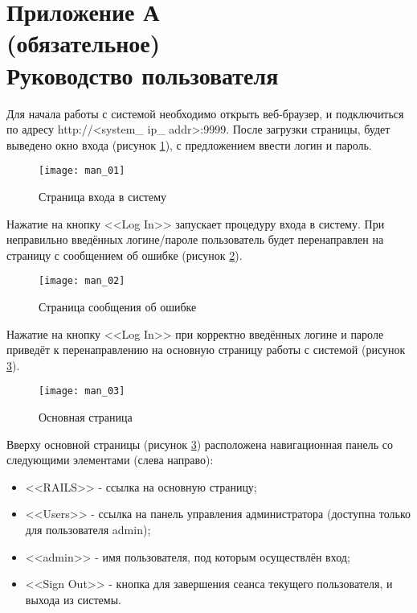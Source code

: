 \section*{Приложение А\\(обязательное)\\Руководство пользователя}

Для начала работы с системой необходимо открыть веб-браузер, и подключиться по адресу http://<system\_ ip\_ addr>:9999.
После загрузки страницы, будет выведено окно входа (рисунок \ref{man_img:01}), с предложением ввести логин и пароль.\par

\begin{figure}[h!]
    \centering
    \texttt{[image: man\_01]}
    \caption{Страница входа в систему}
    \label{man_img:01}
\end{figure}

Нажатие на кнопку <<Log In>> запускает процедуру входа в систему. При неправильно введённых логине/пароле пользователь будет перенаправлен на страницу с сообщением об ошибке (рисунок \ref{man_img:02}).\par

\begin{figure}[h!]
    \centering
    \texttt{[image: man\_02]}
    \caption{Страница сообщения об ошибке}
    \label{man_img:02}
\end{figure}

Нажатие на кнопку <<Log In>> при корректно введённых логине и пароле приведёт к перенаправлению на основную страницу работы с системой (рисунок \ref{man_img:03}).\par

\begin{figure}[h!]
    \centering
    \texttt{[image: man\_03]}
    \caption{Основная страница}
    \label{man_img:03}
\end{figure}

Вверху основной страницы (рисунок \ref{man_img:03}) расположена навигационная панель со следующими элементами (слева направо):
\begin{itemize}
    \item <<RAILS>> - ссылка на основную страницу;
    \item <<Users>> - ссылка на панель управления администратора (доступна только для пользователя admin);
    \item <<admin>> - имя пользователя, под которым осуществлён вход;
    \item <<Sign Out>> - кнопка для завершения сеанса текущего пользователя, и выхода из системы.
\end{itemize}

